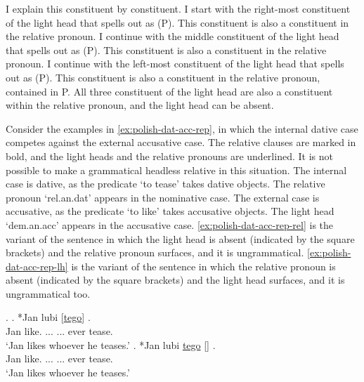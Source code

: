 I explain this constituent by constituent.
I start with the right-most constituent of the light head that spells out as  (P). This constituent is also a constituent in the relative pronoun.
I continue with the middle constituent of the light head that spells out as  (P). This constituent is also a constituent in the relative pronoun.
I continue with the left-most constituent of the light head that spells out as  (P). This constituent is also a constituent in the relative pronoun, contained in P.
All three constituent of the light head are also a constituent within the relative pronoun, and the light head can be absent.

Consider the examples in \ref{ex:polish-dat-acc-rep}, in which the internal dative case competes against the external accusative case. The relative clauses are marked in bold, and the light heads and the relative pronouns are underlined. It is not possible to make a grammatical headless relative in this situation.
The internal case is dative, as the predicate  `to tease' takes dative objects. The relative pronoun  `\ac{rel}.\ac{an}.\ac{dat}' appears in the nominative case.
The external case is accusative, as the predicate  `to like' takes accusative objects. The light head  `\ac{dem}.\ac{an}.\ac{acc}' appears in the accusative case.
\ref{ex:polish-dat-acc-rep-rel} is the variant of the sentence in which the light head is absent (indicated by the square brackets) and the relative pronoun surfaces, and it is ungrammatical.
\ref{ex:polish-dat-acc-rep-lh} is the variant of the sentence in which the relative pronoun is absent (indicated by the square brackets) and the light head surfaces, and it is ungrammatical too.

\ex.
\ag. *Jan lubi [\underline{tego}] \underline{}  .\\
Jan like.\scsub{[acc]} ... ... ever tease.\scsub{[dat]}\\
`Jan likes whoever he teases.' \label{ex:polish-acc-dat-rep-rel}
\bg. *Jan lubi \underline{tego} [\underline{}]  .\\
Jan like.\scsub{[acc]} ... ... ever tease.\scsub{[dat]}\\
`Jan likes whoever he teases.' \label{ex:polish-acc-dat-rep-lh}

